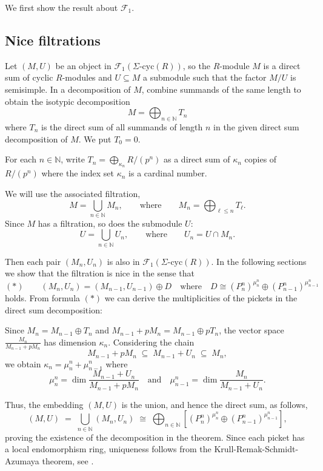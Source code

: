\documentclass[twoside,leqno,12pt]{amsart}
\def\SigCyc{\mbox{$\Sigma$-cyc}}
\theoremstyle{definition}
\theoremstyle{remark}
\numberwithin{equation}{section}
\begin{document}
We first show the result about $\mathcal F_1$.

\subsection{Nice filtrations}

Let $(M,U)$ be an object in $\mathcal F_1(\SigCyc(R))$, so
the $R$-module $M$ is a direct sum of cyclic $R$-modules and $U\subseteq M$
a submodule such that the factor $M/U$ is semisimple.
In a decomposition of $M$,
combine summands of the same length to obtain the isotypic decomposition
$$M=\bigoplus_{n\in\mathbb N} T_n$$
where $T_n$ is the direct sum of all summands of length $n$ in the given direct sum
decomposition of $M$. We put  $T_0=0$.



For each $n\in\mathbb N$,
write $T_n=\bigoplus_{\kappa_n} R/(p^n)$ as a direct sum
of $\kappa_n$ copies of $R/(p^n)$ where the index set
$\kappa_n$ is a cardinal number.


  We will use the associated filtration,
  $$M=\bigcup_{n\in\mathbb N} M_n,\qquad\text{where}\qquad
  M_n=\bigoplus_{\ell\leq n} T_\ell.$$
  Since $M$ has a filtration, so does the submodule $U$:
  $$U=\bigcup_{n\in\mathbb N}U_n,\qquad\text{where}\qquad
  U_n=U\cap M_n.$$


  Then each pair $(M_n,U_n)$ is also in $\mathcal F_1(\SigCyc(R))$.
  In the following sections we show that the filtration is nice
  in the sense that
  $$(*)\qquad (M_n,U_n)=(M_{n-1},U_{n-1})\oplus D\quad\text{where}\quad
  D\cong (P_n^n)^{\mu_n^n}\oplus (P_{n-1}^n)^{\mu_{n-1}^n}$$
  holds.  From formula $(*)$ we can derive
  the multiplicities of the pickets in the direct sum decomposition:

    Since $M_n=M_{n-1}\oplus T_n$ and $M_{n-1}+pM_n=M_{n-1}\oplus pT_n$, the vector space
    $\frac{M_n}{M_{n-1}+pM_n}$ has dimension $\kappa_n$.  Considering the chain
    $$M_{n-1}+pM_n\;\subseteq\; M_{n-1}+U_n\;\subseteq\; M_n,$$
    we obtain $\kappa_n=\mu_n^n+\mu_{n-1}^n$ where
    $$\mu_n^n=\dim\frac{M_{n-1}+U_n}{M_{n-1}+pM_n}
    \quad\text{and}\quad \mu_{n-1}^n=\dim\frac{M_n}{M_{n-1}+U_n}.$$

  Thus, the embedding $(M,U)$ is the union, and hence the direct sum, as follows,
  $$(M,U)\;=\;\bigcup_{n\in\mathbb N}(M_n,U_n)\;\cong\;\bigoplus_{n\in\mathbb N}
  \left[(P_n^n)^{\mu_n^n}\oplus(P_{n-1}^n)^{\mu_{n-1}^n}\right],$$
  proving the existence of the decomposition in the theorem.
  Since each picket has a local endomorphism ring,
  uniqueness follows from the Krull-Remak-Schmidt-Azumaya theorem, see \cite{azu,fac}.
\end{document}
